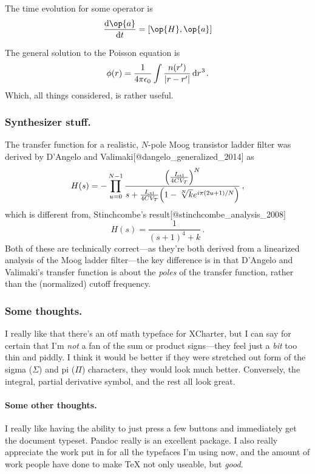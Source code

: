 \documentclass[%
	english,%
	 a4paper,%
	titlepage,%
	fleqn]{article}
\newcommand{\comm}[2]{{\left[ #1 , #2 \right]}} %
\let\originalleft\left
\let\originalright\right
\renewcommand{\left}{\mathopen{}\mathclose\bgroup\originalleft}
\renewcommand{\right}{\aftergroup\egroup\originalright}
\begin{document}
The time evolution for some operator is
\[ \diff{\op{a}}{t} = \comm{\op{H}}{\op{a}} \]

The general solution to the Poisson equation is
\[ \phi(r) = \frac{1}{4\pi\epsilon_0} \int \frac{n(r')}
{| r - r' |} \dl[3] r \,. \] Which, all things considered, is rather
useful.

\subsubsection{Synthesizer stuff.}\label{synthesizer-stuff.}

The transfer function for a realistic, \(N\)-pole Moog transistor ladder
filter was derived by D'Angelo and
Valimaki{[}@dangelo\_generalized\_2014{]} as
\[ H(s) = - \prod_{u = 0}^{N - 1} \frac{
\left( \frac{I_\text{ctl}}{4 C V_T} \right)^N}{s + \frac{I_\text{ctl}}{
4 C V_T} \left(1 - \sqrt[N]{k} e^{i\pi (2 u + 1) / N} \right) } \,,\]
which is different from, Stinchcombe's
result{[}@stinchcombe\_analysis\_2008{]}
\[ H(s) = \frac{1}{(s + 1)^4 + k} \,. \] Both of these are technically
correct---as they're both derived from a linearized analysis of the Moog
ladder filter---the key difference is in that D'Angelo and Valimaki's
transfer function is about the \emph{poles} of the transfer function,
rather than the (normalized) cutoff frequency.

\subsubsection{Some thoughts.}\label{some-thoughts.}

I really like that there's an otf math typeface for XCharter, but I can
say for certain that I'm \emph{not} a fan of the sum or product
signs---they feel just a \emph{bit} too thin and piddly. I think it
would be better if they were stretched out form of the sigma
(\(\Sigma\)) and pi (\(\Pi\)) characters, they would look much better.
Conversely, the integral, partial derivative symbol, and the rest all
look great.

\paragraph{Some other thoughts.}\label{some-other-thoughts.}

I really like having the ability to just press a few buttons and
immediately get the document typeset. Pandoc really is an excellent
package. I also really appreciate the work put in for all the typefaces
I'm using now, and the amount of work people have done to make {\TeX}
not only useable, but \emph{good}.
\end{document}
